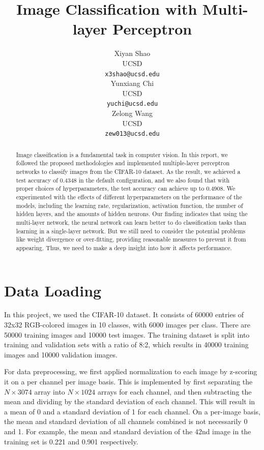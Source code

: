 \documentclass{article}
\title{Image Classification with Multi-layer Perceptron}
\author{%
    Xiyan Shao \\
    UCSD \\
    \texttt{x3shao@ucsd.edu} \\
    \And
    Yunxiang Chi \\
    UCSD \\
    \texttt{yuchi@ucsd.edu} \\
    \And
    Zelong Wang\\
    UCSD \\
    \texttt{zew013@ucsd.edu} \\
}
\begin{document}
    \maketitle


    \begin{abstract}
    Image classification is a fundamental task in computer vision.
    In this report, we followed the proposed methodologies and implemented multiple-layer perceptron networks to classify images from the CIFAR-10 dataset.
    As the result, we achieved a test accuracy of 0.4348 in the default configuration, and we also found that with proper choices of hyperparameters, the test accuracy can achieve up to 0.4908.
    We experimented with the effects of different hyperparameters on the performance of the models, including the learning rate, regularization, activation function, the number of hidden layers, and the amounts of hidden neurons.
    Our finding indicates that using the multi-layer network, the neural network can learn better to do classification tasks than learning in a single-layer network.
    But we still need to consider the potential problems like weight divergence or over-fitting, providing reasonable measures to prevent it from appearing.
    Thus, we need to make a deep insight into how it affects performance.

    \end{abstract}


    \section{Data Loading}\label{sec:data-loading}


    In this project, we used the CIFAR-10 dataset.
    It consists of 60000 entries of 32x32 RGB-colored images in 10 classes, with 6000 images per class.
    There are 50000 training images and 10000 test images.
    The training dataset is split into training and validation sets with a ratio of 8:2, which results in 40000 training images and 10000 validation images.

    For data preprocessing, we first applied normalization to each image by z-scoring it on a per channel per image basis.
    This is implemented by first separating the $N \times 3074$ array into $N \times 1024$ arrays for each channel, and then subtracting the mean and dividing by the standard deviation of each channel.
    This will result in a mean of 0 and a standard deviation of 1 for each channel.
    On a per-image basis, the mean and standard deviation of all channels combined is not necessarily 0 and 1.
    For example, the mean and standard deviation of the 42nd image in the training set is 0.221 and 0.901 respectively.
\end{document}

